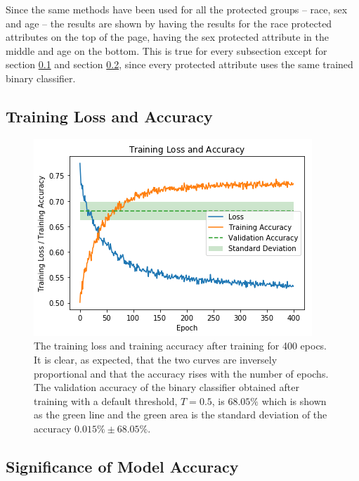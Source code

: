 \documentclass[11pt, fleqn, titlepage]{article}
\begin{document}
	Since the same methods have been used for all the protected groups -- race, sex and age -- the results are shown by having the results for the race protected attributes on the top of the page, having the sex protected attribute in the middle and age on the bottom. This is true for every subsection except for section \ref{training_loss_and_accuracy} and section \ref{modelAccuracy}, since every protected attribute uses the same trained binary classifier.
	
	\subsection{Training Loss and Accuracy}\label{training_loss_and_accuracy}
	
	\begin{figure}[H]
			\centering
			\includegraphics[width=0.5\linewidth]{imgs/loss_curve.png}
		\caption{The training loss and training accuracy after training for 400 epocs. It is clear, as expected, that the two curves are inversely proportional and that the accuracy rises with the number of epochs.  The validation accuracy of the binary classifier obtained after training with a default threshold, $ T=0.5 $, is $ 68.05\%$ which is shown as the green line and the green area is the standard deviation of the accuracy $0.015\% \pm 68.05\%$.%
		}
		\label{fig:losscurve}
	\end{figure}
	
	\subsection{Significance of Model Accuracy}\label{modelAccuracy}
	
\end{document}
